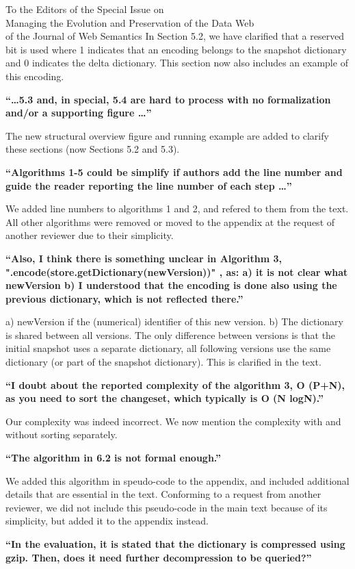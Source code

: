 \documentclass{letter}
\newcounter{section}
\begin{document}
\begin{letter}{To the Editors of the Special Issue on\\Managing the Evolution and Preservation of the Data Web\\of the Journal of Web Semantics}
In Section 5.2, we have clarified that a reserved bit is used where 1 indicates that an encoding
belongs to the snapshot dictionary and 0 indicates the delta dictionary.
This section now also includes an example of this encoding.

\textbf{\enquote{\ldots 5.3 and, in special, 5.4 are hard to process with no formalization and/or a supporting figure \ldots}}

The new structural overview figure and running example are added to clarify these sections (now Sections 5.2 and 5.3).

\textbf{\enquote{Algorithms 1-5 could be simplify if authors add the line number and guide the reader reporting the line number of each step \ldots}}

We added line numbers to algorithms 1 and 2, and refered to them from the text.
All other algorithms were removed or moved to the appendix at the request of another reviewer due to their simplicity.

\textbf{\enquote{Also, I think there is something unclear in Algorithm 3, ".encode(store.getDictionary(newVersion))" , as: a) it is not clear what newVersion b) I understood that the encoding is done also using the previous dictionary, which is not reflected there.}}

a) newVersion if the (numerical) identifier of this new version.
b) The dictionary is shared between all versions. The only difference between versions is that the initial snapshot uses a separate dictionary, all following versions use the same dictionary (or part of the snapshot dictionary).
This is clarified in the text.

\textbf{\enquote{I doubt about the reported complexity of the algorithm 3, O (P+N), as you need to sort the changeset, which typically is O (N logN).}}

Our complexity was indeed incorrect. We now mention the complexity with and without sorting separately.

\textbf{\enquote{The algorithm in 6.2 is not formal enough.}}

We added this algorithm in speudo-code to the appendix,
and included additional details that are essential in the text.
Conforming to a request from another reviewer, we did not include this pseudo-code in the main text because of its simplicity,
but added it to the appendix instead.

\textbf{\enquote{In the evaluation, it is stated that the dictionary is compressed using gzip. Then, does it need further decompression to be queried?}}


\end{letter}
\end{document}
